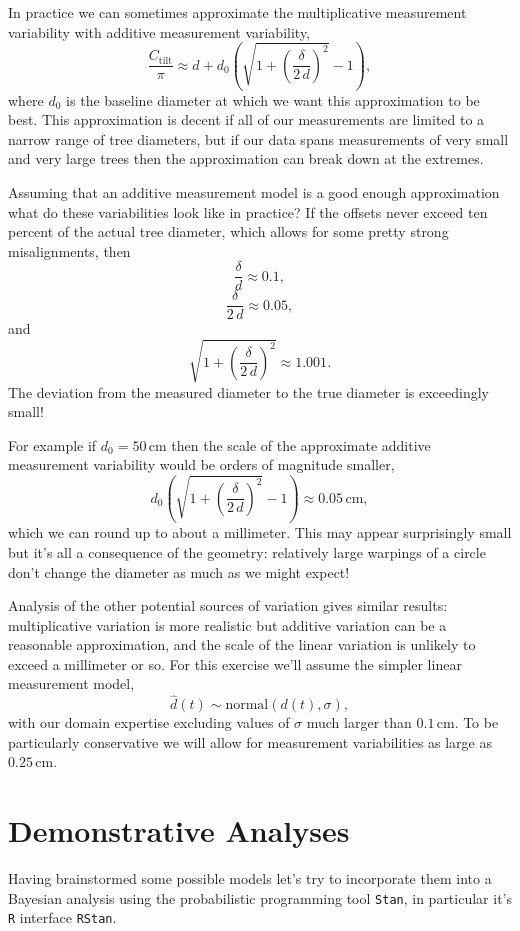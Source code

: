 \documentclass[
  letterpaper,
  DIV=11,
  numbers=noendperiod]{scrartcl}
\begin{document}
In practice we can sometimes approximate the multiplicative measurement
variability with additive measurement variability, \[
\frac{C_{\mathrm{tilt}}}{\pi} \approx
d
+ d_{0}
  \left( \sqrt{ 1 + \left( \frac{\delta}{2 \, d} \right)^{2} } - 1 \right),
\] where \(d_{0}\) is the baseline diameter at which we want this
approximation to be best. This approximation is decent if all of our
measurements are limited to a narrow range of tree diameters, but if our
data spans measurements of very small and very large trees then the
approximation can break down at the extremes.

Assuming that an additive measurement model is a good enough
approximation what do these variabilities look like in practice? If the
offsets never exceed ten percent of the actual tree diameter, which
allows for some pretty strong misalignments, then \[
\frac{ \delta }{ d } \approx 0.1,
\] \[
\frac{ \delta }{ 2 \, d } \approx 0.05,
\] and \[
\sqrt{ 1 + \left( \frac{\delta}{2 \, d} \right)^{2} } \approx 1.001.
\] The deviation from the measured diameter to the true diameter is
exceedingly small!

For example if \(d_{0} = 50 \, \mathrm{cm}\) then the scale of the
approximate additive measurement variability would be orders of
magnitude smaller, \[
d_{0}
\left( \sqrt{ 1 + \left( \frac{\delta}{2 \, d} \right)^{2} } - 1 \right)
\approx 0.05 \, \mathrm{cm},
\] which we can round up to about a millimeter. This may appear
surprisingly small but it's all a consequence of the geometry:
relatively large warpings of a circle don't change the diameter as much
as we might expect!

Analysis of the other potential sources of variation gives similar
results: multiplicative variation is more realistic but additive
variation can be a reasonable approximation, and the scale of the linear
variation is unlikely to exceed a millimeter or so. For this exercise
we'll assume the simpler linear measurement model, \[
\hat{d}(t) \sim \text{normal}(d(t), \sigma),
\] with our domain expertise excluding values of \(\sigma\) much larger
than \(0.1 \, \mathrm{cm}\). To be particularly conservative we will
allow for measurement variabilities as large as \(0.25 \, \mathrm{cm}\).

\hypertarget{sec:analyses}{%
\section{Demonstrative Analyses}\label{sec:analyses}}

Having brainstormed some possible models let's try to incorporate them
into a Bayesian analysis using the probabilistic programming tool
\texttt{Stan}, in particular it's \texttt{R} interface \texttt{RStan}.
\end{document}
